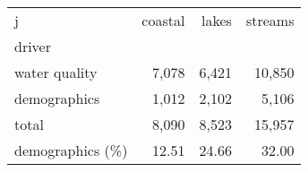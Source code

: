 \begin{tabular}{lrrr}
\toprule
j & coastal & lakes & streams \\
driver &  &  &  \\
\midrule
water quality & 7,078 & 6,421 & 10,850 \\
demographics & 1,012 & 2,102 & 5,106 \\
total & 8,090 & 8,523 & 15,957 \\
demographics (\%) & 12.51 & 24.66 & 32.00 \\
\bottomrule
\end{tabular}
